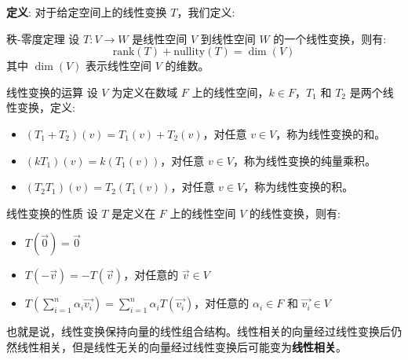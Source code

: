 \documentclass[a4paper,12pt]{ctexart}
\begin{document}
\textbf{定义}: 对于给定空间上的线性变换 $T$，我们定义:

\begin{mythm}{秩-零度定理}{}
    设 $T: V \to W$ 是线性空间 $V$ 到线性空间 $W$ 的一个线性变换，则有:
    \[
    \text{rank}(T) + \text{nullity}(T) = \dim(V)
    \]
    其中 $\dim(V)$ 表示线性空间 $V$ 的维数。
\end{mythm}

\begin{mydef}{线性变换的运算}{}
设 $V$ 为定义在数域 $F$ 上的线性空间，$k \in F$，$T_1$ 和 $T_2$ 是两个线性变换，定义:
\begin{itemize}
    \item $(T_1 + T_2)(v) = T_1(v) + T_2(v)$，对任意 $v \in V$，称为线性变换的和。
    \item $(kT_1)(v) = k(T_1(v))$，对任意 $v \in V$，称为线性变换的纯量乘积。
    \item $(T_2 T_1)(v) = T_2(T_1(v))$，对任意 $v \in V$，称为线性变换的积。
\end{itemize}
\end{mydef}

\begin{myprop}{线性变换的性质}{}
设 $T$ 是定义在 $F$ 上的线性空间 $V$ 的线性变换，则有:
\begin{itemize}
    \item $T(\vec{0}) = \vec{0}$
    \item $T(-\vec{v}) = -T(\vec{v})$，对任意的 $\vec{v} \in V$
    \item $T\left(\sum_{i=1}^{n} \alpha_i \vec{v_i}\right) = \sum_{i=1}^{n} \alpha_i T(\vec{v_i})$，对任意的 $\alpha_i \in F$ 和 $\vec{v_i} \in V$
\end{itemize}
也就是说，线性变换保持向量的线性组合结构。线性相关的向量经过线性变换后仍然线性相关，但是线性无关的向量经过线性变换后可能变为\textbf{线性相关}。
\end{myprop}

\newpage
\end{document}
